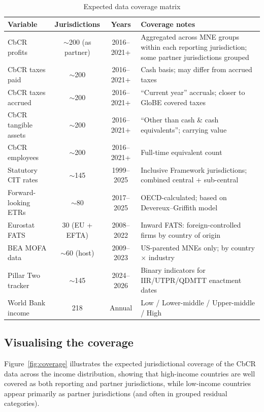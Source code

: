 \documentclass[12pt,a4paper]{article}
\begin{document}
\begin{table}[!ht]
\centering
\caption{Expected data coverage matrix}
\label{tab:coverage}
\small
\begin{tabular}{p{3.5cm}ccp{5cm}}
\toprule
\textbf{Variable} & \textbf{Jurisdictions} & \textbf{Years} & \textbf{Coverage notes} \\
\midrule
CbCR profits & $\sim$200 (as partner) & 2016--2021+ & Aggregated across MNE groups within each reporting jurisdiction; some partner jurisdictions grouped \\
\addlinespace
CbCR taxes paid & $\sim$200 & 2016--2021+ & Cash basis; may differ from accrued taxes \\
\addlinespace
CbCR taxes accrued & $\sim$200 & 2016--2021+ & ``Current year'' accruals; closer to GloBE covered taxes \\
\addlinespace
CbCR tangible assets & $\sim$200 & 2016--2021+ & ``Other than cash \& cash equivalents''; carrying value \\
\addlinespace
CbCR employees & $\sim$200 & 2016--2021+ & Full-time equivalent count \\
\addlinespace
Statutory CIT rates & $\sim$145 & 1999--2025 & Inclusive Framework jurisdictions; combined central + sub-central \\
\addlinespace
Forward-looking ETRs & $\sim$80 & 2017--2025 & OECD-calculated; based on Devereux--Griffith model \\
\addlinespace
Eurostat FATS & 30 (EU + EFTA) & 2008--2022 & Inward FATS: foreign-controlled firms by country of origin \\
\addlinespace
BEA MOFA data & $\sim$60 (host) & 2009--2023 & US-parented MNEs only; by country $\times$ industry \\
\addlinespace
Pillar Two tracker & $\sim$145 & 2024--2026 & Binary indicators for IIR/UTPR/QDMTT enactment dates \\
\addlinespace
World Bank income & 218 & Annual & Low / Lower-middle / Upper-middle / High \\
\bottomrule
\end{tabular}
\end{table}

\subsection{Visualising the coverage}

Figure~\ref{fig:coverage} illustrates the expected jurisdictional coverage of the CbCR data across the income distribution, showing that high-income countries are well covered as both reporting and partner jurisdictions, while low-income countries appear primarily as partner jurisdictions (and often in grouped residual categories).
\end{document}
